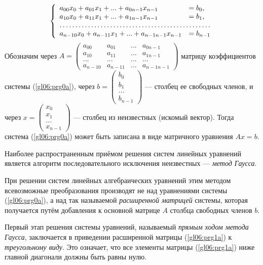 \begin{equation}\label{gl06:prg0a}
\left\{\begin{array}{ll}
a_{00}x_0+a_{01}x_1+...+a_{0n-1}x_{n-1}&=b_0,\\
a_{10}x_0+a_{11}x_1+...+a_{1n-1}x_{n-1}&=b_1,\\
\hdotsfor{2}\\
a_{n-10}x_0+a_{n-11}x_1+...+a_{n-1n-1}x_{n-1}&=b_{n-1}
\end{array}\right.
\end{equation}
Обозначим через 
$A=\left(\begin{matrix}
a_{00}&a_{01}&...&a_{0n-1}\\
a_{10}&a_{11}&...&a_{1n-1}\\
...&...&...&...\\
a_{n-10}&a_{n-11}&...&a_{n-1n-1}
\end{matrix}\right)$
матрицу коэффициентов системы (\ref{gl06:prg0a}), через 
$b=\left(\begin{matrix}b_0\\b_1\\...\\b_{n-1}\end{matrix}\right)$ --- столбец ее свободных членов, и через
$x=\left(\begin{matrix}x_0\\x_1\\...\\x_{n-1}\end{matrix}\right)$ --- столбец из неизвестных (искомый вектор). Тогда
система (\ref{gl06:prg0a})  может быть записана в виде матричного уравнения  $Ax=b$.

Наиболее распространенным приёмом решения систем линейных уравнений является алгоритм последовательного исключения неизвестных --- \emph{метод Гаусса}.

При решении систем линейных алгебраических уравнений этим методом всевозможные преобразования производят не над
уравнениями системы (\ref{gl06:prg0a}), а над так называемой \emph{расширенной матрицей} системы, которая получается
путём добавления к основной матрице $A$ столбца свободных членов $b$.

Первый этап решения системы уравнений, называемый \emph{прямым ходом метода Гаусса}, заключается в приведении
расширенной матрицы (\ref{gl06:prg1a}) к \emph{треугольному виду}. Это означает, что все элементы матрицы
(\ref{gl06:prg1a}) ниже главной диагонали должны быть равны нулю.

